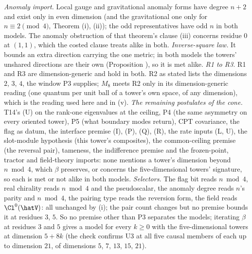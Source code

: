 \emph{Anomaly import.} Local gauge and gravitational anomaly forms have degree $n + 2$ and exist only in even dimension (and the gravitational one only for $n \equiv 2 \pmod 4$, Theorem (i), (ii)); the odd representatives have odd $n$ in both models. The anomaly obstruction of that theorem's clause (iii) concerns residue $0$ at $(1,1)$, which the costed clause treats alike in both. \emph{Inverse-square law.} It bounds an extra direction carrying the one metric; in both models the towers' unshared directions are their own (Proposition ), so it is met alike. \emph{R1 to R3.} R1 and R3 are dimension-generic and hold in both. R2 as stated lists the dimensions $2$, $3$, $4$, the window P3 supplies; $M_{8}$ meets R2 only in its dimension-generic reading (one quantum per unit ball of a tower's own space, of any dimension), which is the reading used here and in (v). \emph{The remaining postulates of the cone.} T14's (U) on the rank-one eigenvalues at the ceiling, P4 (the same asymmetry on every oriented tower), P5 (what boundary modes return), CPT covariance, the flag as datum, the interface premise (I), (P), (Q), (R), the rate inputs (L, U), the slot-module hypothesis (this tower's composites), the common-ceiling premise (the reversal pair), tameness, the indifference premise and the frozen-point, tractor and field-theory imports: none mentions a tower's dimension beyond $n \bmod 4$, which $\beta$ preserves, or concerns the five-dimensional towers' signature, so each is met or not alike in both models. \emph{Selectors.} The flag bit reads $n \bmod 4$, real chirality reads $n \bmod 4$ and the pseudoscalar, the anomaly degree reads $n$'s parity and $n \bmod 4$, the pairing type reads the reversion form, the field reads $\Cl^{0}(\hatV)$: all unchanged by (i); the pair count changes but no premise bounds it at residues $3$, $5$. So no premise other than P3 separates the models; iterating $\beta$ at residues $3$ and $5$ gives a model for every $k \ge 0$ with the five-dimensional towers at dimension $5 + 8k$ (the check confirms U3 at all five causal members of each up to dimension $21$, of dimensions $5$, $7$, $13$, $15$, $21$).

